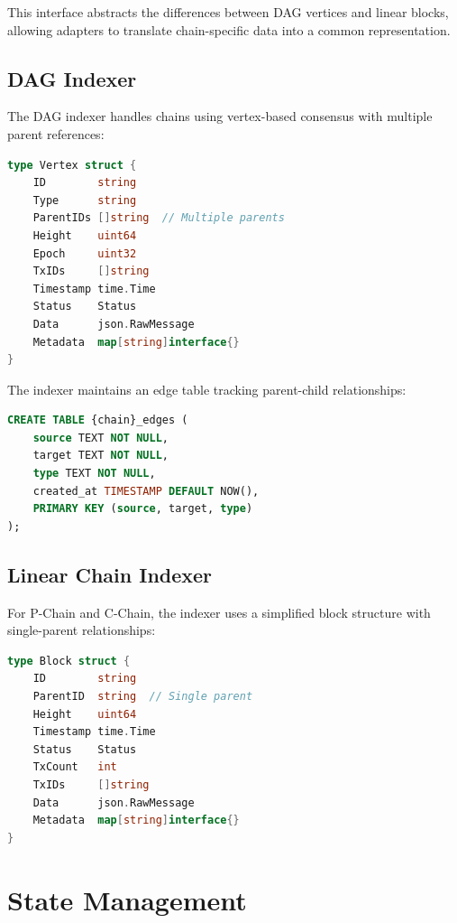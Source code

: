 \documentclass[11pt,twocolumn]{article}
\begin{document}
This interface abstracts the differences between DAG vertices and linear blocks, allowing adapters to translate chain-specific data into a common representation.

\subsection{DAG Indexer}

The DAG indexer handles chains using vertex-based consensus with multiple parent references:

\begin{lstlisting}[language=Go,caption={DAG vertex structure}]
type Vertex struct {
    ID        string
    Type      string
    ParentIDs []string  // Multiple parents
    Height    uint64
    Epoch     uint32
    TxIDs     []string
    Timestamp time.Time
    Status    Status
    Data      json.RawMessage
    Metadata  map[string]interface{}
}
\end{lstlisting}

The indexer maintains an edge table tracking parent-child relationships:

\begin{lstlisting}[language=SQL,caption={DAG edge schema}]
CREATE TABLE {chain}_edges (
    source TEXT NOT NULL,
    target TEXT NOT NULL,
    type TEXT NOT NULL,
    created_at TIMESTAMP DEFAULT NOW(),
    PRIMARY KEY (source, target, type)
);
\end{lstlisting}

\subsection{Linear Chain Indexer}

For P-Chain and C-Chain, the indexer uses a simplified block structure with single-parent relationships:

\begin{lstlisting}[language=Go,caption={Linear block structure}]
type Block struct {
    ID        string
    ParentID  string  // Single parent
    Height    uint64
    Timestamp time.Time
    Status    Status
    TxCount   int
    TxIDs     []string
    Data      json.RawMessage
    Metadata  map[string]interface{}
}
\end{lstlisting}

\section{State Management}
\end{document}
